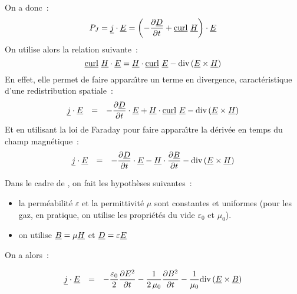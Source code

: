 On a donc~:
\begin{equation}
P_J=\underline{j}\cdot\underline{E}=\left(-\frac{\partial \underline{D}}{\partial t} +\underline{\text{curl}}\ \underline{H}\right)\cdot\underline{E}
\end{equation}
On utilise alors la relation suivante~:
\begin{equation}
\underline{\text{curl}}\ \underline{H}\cdot\underline{E}=\underline{H}\cdot\underline{\text{curl}}\ \underline{E}-\text{div}\,(\underline{E}\times\underline{H})
\end{equation}
En effet, elle permet de faire appara\^\i tre un
terme en divergence, caract\'eristique d'une redistribution spatiale~:
\begin{equation}
\begin{array}{lll}
\underline{j}\cdot\underline{E}&=&
\displaystyle-\frac{\partial \underline{D}}{\partial t}\cdot\underline{E}
+\underline{H}\cdot\underline{\text{curl}}\ \underline{E}-\text{div}\,(\underline{E}\times\underline{H})\\
\end{array}
\end{equation}
Et en utilisant la loi de Faraday pour faire appara\^\i tre la d\'eriv\'ee en temps du champ magn\'etique~:
\begin{equation}
\begin{array}{lll}
\underline{j}\cdot\underline{E}&=&
\displaystyle-\frac{\partial \underline{D}}{\partial t}\cdot\underline{E}
-\underline{H}\cdot\frac{\partial \underline{B}}{\partial t}-\text{div}\,(\underline{E}\times\underline{H})\\
\end{array}
\end{equation}

Dans le cadre de \CS, on fait les hypoth\`eses suivantes~:
\begin{itemize}
\item la perm\'eabilit\'e $\varepsilon$ et la permittivit\'e $\mu$
sont constantes et uniformes (pour les gaz, en pratique, on utilise
les propri\'et\'es du vide $\varepsilon_0$ et $\mu_0$).
\item on utilise $\underline{B} = \mu \underline{H}$ et $\underline{D} = \varepsilon \underline{E}$
\end{itemize}

On a alors~:

\begin{equation}
\begin{array}{lll}
\displaystyle\underline{j}\cdot\underline{E}&=&
\displaystyle-\frac{\varepsilon_0}{2}\frac{\partial E^2}{\partial t}
-\frac{1}{2\,\mu_0}\frac{\partial B^2}{\partial t}
-\frac{1}{\mu_0}\text{div}\,(\underline{E}\times\underline{B})
\end{array}
\end{equation}

